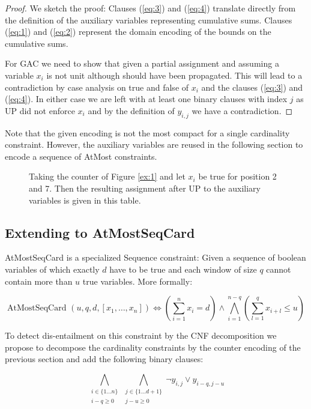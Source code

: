 \documentclass[]{llncs}
\newcommand{\AtMostSeqCard}{AtMostSeqCard }
\begin{document}
\begin{proof}
    We sketch the proof: Clauses (\ref{eq:3}) and (\ref{eq:4}) translate
    directly from the definition of the auxiliary variables representing
    cumulative sums.  Clauses (\ref{eq:1}) and (\ref{eq:2}) represent
    the domain encoding of the bounds on the cumulative sums. 
    
    For GAC we need to show that given a partial assignment and assuming
    a variable $x_i$ is not unit although should have been propagated.
    This will lead to a contradiction by case analysis on true and false
    of $x_i$ and the clauses (\ref{eq:3}) and (\ref{eq:4}). In either
    case we are left with at least one binary clauses with index $j$ as
    UP did not enforce $x_i$ and by the definition of $y_{i,j}$ we have a
    contradiction. 
\end{proof}

Note that the given encoding is not the most compact for a single
cardinality constraint.  However, the auxiliary variables are reused in
the following section to encode a sequence of AtMost constraints.        


\begin{figure}
\centering 
\caption{Taking the counter of Figure \ref{ex:1} and let $x_{i}$ be
true for position 2 and 7. Then the resulting assignment after UP to the
auxiliary variables is given in this table. } 

\label{ex:2}
\end{figure}


\subsection{Extending to \AtMostSeqCard}

\AtMostSeqCard is a specialized Sequence constraint: Given a sequence of
boolean variables of which exactly $d$ have to be true and each window
of size $q$ cannot contain more than $u$ true variables. More formally: 

$$ \text{\AtMostSeqCard}(u,q,d,[x_{1},\ldots,x_{n}]) \iff (\sum_{i=1}^n
x_{i} = d) \wedge \bigwedge_{i=1}^{n-q}(\sum_{l=1}^q x_{i+l} \leq u )$$

To detect dis-entailment on this constraint by the CNF decomposition we
propose to decompose the cardinality constraints by the counter encoding
of the previous section and add the following binary clauses:

\begin{equation} \label{eq:6}
    \bigwedge_{\substack{i \in \{1 \ldots n\} \\ i-q \geq 0}}
    \bigwedge_{\substack{j\in\{1\ldots d+1\}\\ j-u \geq 0}}
    \neg y_{i,j} \vee y_{i-q,j-u}
\end{equation}               
\end{document}
